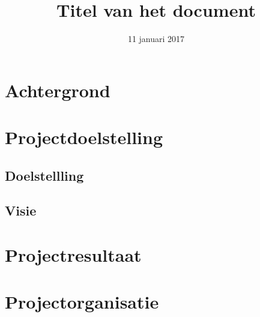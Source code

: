 \documentclass{uva-inf-article}
\title{Titel van het document}
\date{11 januari 2017}
\begin{document}
\maketitle


\tableofcontents


\section{Achtergrond}
\lipsum[31]


\section{Projectdoelstelling}
\lipsum[32]

\subsection{Doelstellling}
\lipsum[33]

\subsection{Visie}
\lipsum[34]


\section{Projectresultaat}
\lipsum[35]


\section{Projectorganisatie}
\lipsum[36]
\end{document}
